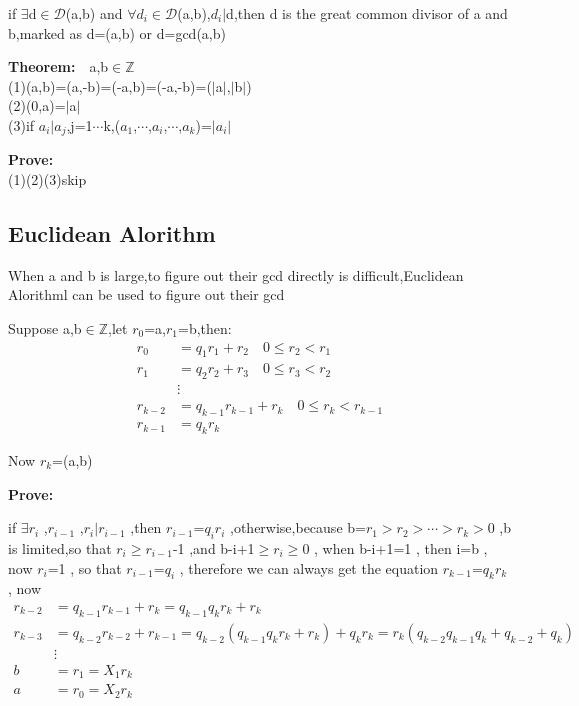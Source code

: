 \documentclass{ctexart}
\begin{document}
if \(\exists\)d\(\in\)\(\mathcal{D}\)(a,b) and \(\forall\)\(d_i\)\(\in\)\(\mathcal{D}\)(a,b),\(d_i\)\(\mid\)d,then d is the great common divisor of a and b,marked as d=(a,b) or d=gcd(a,b)


\textbf{Theorem:}\(\quad\)a,b\(\in\)\(\mathbb{Z}\)
\\(1)(a,b)=(a,-b)=(-a,b)=(-a,-b)=(\(\vert\)a\(\vert\),\(\vert\)b\(\vert\))
\\(2)(0,a)=\(\vert\)a\(\vert\)
\\(3)if \(a_i\)\(\mid\)\(a_j\),j=1\(\cdots\)k,(\(a_1\),\(\cdots\),\(a_i\),\(\cdots\),\(a_k\))=\(\vert\)\(a_i\)\(\vert\)

\vspace{12 pt}
\textbf{Prove:}
\\(1)(2)(3)skip


\subsection{Euclidean Alorithm}

When a and b is large,to figure out their gcd directly is difficult,Euclidean Alorithml can be used to figure out their gcd

Suppose a,b\(\in\)\(\mathbb{Z}\),let \(r_0\)=a,\(r_1\)=b,then:
\begin{align*}
r_0&=q_{1}r_{1}+r_{2}\quad 0\le r_{2}<r_1\\
r_1&=q_{2}r_{2}+r_{3}\quad 0\le r_{3}<r_2\\
&\vdots\\
r_{k-2}&=q_{k-1}r_{k-1}+r_{k}\quad 0\le r_{k}<r_{k-1}\\
r_{k-1}&=q_{k}r_{k}
\end{align*}

Now \(r_k\)=(a,b)

\textbf{Prove:}

if \(\exists\)\(r_i\) ,\(r_{i-1}\) ,\(r_i\)\(\mid\)\(r_{i-1}\) ,then \(r_{i-1}\)=\(q_i\)\(r_i\) ,otherwise,because b=\(r_1\)$>$\(r_2\)$>$\(\cdots\)$>$\(r_{k}\)$>$0 ,b is limited,so that \(r_i\)\(\ge\)\(r_{i-1}\)-1 ,and b-i+1\(\ge\)\(r_i\)\(\ge\)0 , when b-i+1=1 , then i=b , now \(r_i\)=1 , so that \(r_{i-1}\)=\(q_i\) , therefore we can always get the equation \(r_{k-1}\)=\(q_k\)\(r_k\) , now 
\begin{align*}
r_{k-2}&=q_{k-1}r_{k-1}+r_{k}=q_{k-1}q_kr_k+r_k\\
r_{k-3}&=q_{k-2}r_{k-2}+r_{k-1}=q_{k-2}(q_{k-1}q_kr_k+r_k)+q_kr_k=r_k(q_{k-2}q_{k-1}q_{k}+q_{k-2}+q_{k})\\
&\vdots\\
b&=r_1=X_1r_k\\
a&=r_0=X_2r_k
\end{align*}
\end{document}
